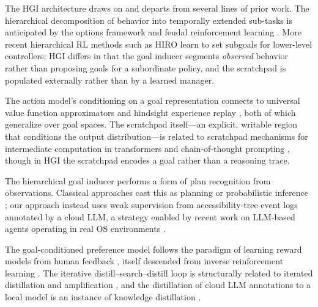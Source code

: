 \documentclass[12pt, a4paper]{article}
\begin{document}
The HGI architecture draws on and departs from several lines of prior work. The hierarchical decomposition of behavior into temporally extended sub-tasks is anticipated by the options framework \citep{sutton1999options} and feudal reinforcement learning \citep{dayan1993feudal}. More recent hierarchical RL methods such as HIRO \citep{nachum2018hiro} learn to set subgoals for lower-level controllers; HGI differs in that the goal inducer segments \textit{observed} behavior rather than proposing goals for a subordinate policy, and the scratchpad is populated externally rather than by a learned manager.

The action model's conditioning on a goal representation connects to universal value function approximators \citep{schaul2015uvfa} and hindsight experience replay \citep{andrychowicz2017her}, both of which generalize over goal spaces. The scratchpad itself---an explicit, writable region that conditions the output distribution---is related to scratchpad mechanisms for intermediate computation in transformers \citep{nye2021scratchpads} and chain-of-thought prompting \citep{wei2022cot}, though in HGI the scratchpad encodes a goal rather than a reasoning trace.

The hierarchical goal inducer performs a form of plan recognition from observations. Classical approaches cast this as planning \citep{ramirez2009plan} or probabilistic inference \citep{sukthankar2014plan}; our approach instead uses weak supervision from accessibility-tree event logs annotated by a cloud LLM, a strategy enabled by recent work on LLM-based agents operating in real OS environments \citep{xie2024osworld}.

The goal-conditioned preference model follows the paradigm of learning reward models from human feedback \citep{christiano2017rlhf}, itself descended from inverse reinforcement learning \citep{ng2000irl}. The iterative distill--search--distill loop is structurally related to iterated distillation and amplification \citep{christiano2018ida}, and the distillation of cloud LLM annotations to a local model is an instance of knowledge distillation \citep{hinton2015distilling}.
\end{document}
